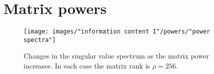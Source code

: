 \section{Matrix powers}




\begin{figure}[htbp] %
   \centering
   \texttt{[image: images/"information content I"/powers/"power spectra"]} 
   \caption[Changes in the singular value spectrum as the matrix power increases]{Changes in the singular value spectrum as the matrix power increases. In each case the matrix rank is $\rho = 256$.}
   \label{fig:powers:raised}
\end{figure}



\endinput
